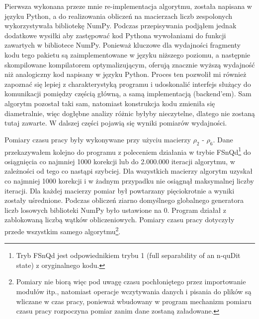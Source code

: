 \documentclass[11pt, a4paper]{article}
\begin{document}
\begin{sloppypar}
    Pierwsza wykonana przeze mnie re-implementacja algorytmu, została napisana w języku
    Python, a do realizowania obliczeń na macierzach liczb zespolonych wykorzystywała bibliotekę
    NumPy. Podczas przepisywania podjąłem jednak dodatkowe wysiłki aby zastępować kod
    Pythona wywołaniami do funkcji zawartych w bibliotece NumPy. Ponieważ kluczowe dla wydajności
    fragmenty kodu tego pakietu są zaimplementowane w języku niższego poziomu, a
    następnie skompilowane kompilatorem optymalizującym, oferują znacznie wyższą wydajność
    niż analogiczny kod napisany w języku Python. Proces ten pozwolił mi również
    zapoznać się lepiej z charakterystyką programu i udoskonalić interfejs służący do
    komunikacji pomiędzy częścią główną, a samą implementacją (backend'em). Sam algorytm
    pozostał taki sam, natomiast konstrukcja kodu zmieniła się diametralnie, więc
    dogłębne analizy różnic byłyby nieczytelne, dlatego nie zostaną tutaj zawarte. W
    dalszej części pojawią się wyniki pomiarów wydajności.

    Pomiary czasu pracy były wykonywane przy użyciu macierzy $\rho_{2}$ - $\rho_{6}$. Dane
    przekazywałem kolejno do programu z poleceniem działania w trybie FSnQd\footnote{Tryb
    FSnQd jest odpowiednikiem trybu 1 (full separability of an n-quDit state) z
    oryginalnego kodu.} do osiągnięcia co najmniej 1000 korekcji lub do 2.000.000 iteracji
    algorytmu, w zależności od tego co nastąpi szybciej. Dla wszystkich macierzy algorytm
    uzyskał co najmniej 1000 korekcji i w żadnym przypadku nie osiągnął maksymalnej liczby
    iteracji. Dla każdej macierzy pomiar był powtarzany pięciokrotnie a wyniki zostały
    uśrednione. Podczas obliczeń ziarno domyślnego globalnego generatora liczb losowych biblioteki
    NumPy było ustawione na 0. Program działał z zablokowaną liczbą wątków obliczeniowych.
    Pomiary czasu pracy dotyczyły przede wszystkim samego algorytmu\footnote{Pomiary nie
    biorą więc pod uwagę czasu pochłoniętego przez importowanie modułów itp., natomiast operacje
    wczytywania danych i pisania do plików są wliczane w czas pracy, ponieważ wbudowany
    w program mechanizm pomiaru czasu pracy rozpoczyna pomiar zanim dane zostaną
    załadowane.}.


\end{sloppypar}
\end{document}
